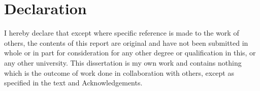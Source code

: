 \chapter{Declaration}

I hereby declare that except where specific reference is made to the work of others, the contents of this report are original and have not been submitted in whole or in part for consideration for any other degree or qualification in this, or any other university. This dissertation is my own work and contains nothing which is the outcome of work done in collaboration with others, except as specified in the text and Acknowledgements.